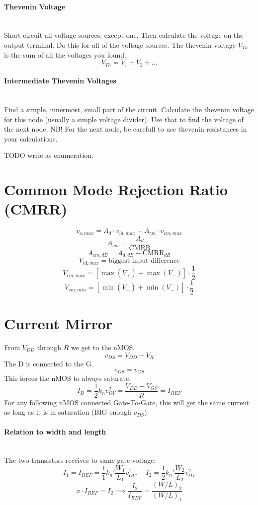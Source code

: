 \documentclass[twocolumn]{article}
\begin{document}
    \paragraph{Thevenin Voltage} \hfill \\
      Short-circuit all voltage sources, except one.
      Then calculate the voltage on the output terminal.
      Do this for all of the voltage sources.
      The thevenin voltage $V_{Th}$ is the sum of all the voltages you found.
      $$V_{Th} = V_1 + V_2 + ...$$
    \paragraph{Intermediate Thevenin Voltages} \hfill \\
      Find a simple, innermost, small part of the circuit.
      Calculate the thevenin voltage for this node (usually a simple voltage
      divider).
      Use that to find the voltage of the next node.
      NB! For the next node, be carefull to use thevenin resistances in
      your calculations.

      TODO write as enumeration.

  \section{Common Mode Rejection Ratio (CMRR)}
    $$v_{o,max} = A_d \cdot v_{id,max} + A_{cm} \cdot v_{cm,max}$$
    $$A_{cm} = \frac{A_d}{\text{CMRR}}$$
    $$A_{cm,dB} = A_{d,dB} - \text{CMRR}_{dB}$$
    $$V_{id,max} = \text{biggest input difference}$$
    $$V_{cm,max} = \left[\max(V_+) + \max(V_-) \right] \cdot \frac{1}{2}$$
    $$V_{cm,min} = \left[\min(V_+) + \min(V_-) \right] \cdot \frac{1}{2}$$

  \section{Current Mirror}
    From $V_{DD}$ through $R$ we get to the nMOS.
    $$v_{DS} = V_{DD} - V_R$$
    The D is connected to the G.
    $$v_{DS} = v_{GS}$$
    This forces the nMOS to always saturate.
    $$I_D = \frac{1}{2} k_n v_{OV}^2 = \frac{V_{DD} - V_{GS}}{R} = I_{REF}$$
    For any following nMOS connected Gate-To-Gate, this will get the same
    current as long as it is in saturation (BIG enough $v_{DS}$).

    \paragraph{Relation to width and length} \hfill \\
    The two transistors receives to same gate voltage.
    $$I_1 = I_{REF} = \frac{1}{1} k_n' \frac{W_1}{L_1} v_{OV}^1
      ,\quad
      I_2 = \frac{1}{2} k_n' \frac{W_2}{L_2} v_{OV}^2
      $$
    $$x \cdot I_{REF} = I_2
      \implies \frac{I_2}{I_{REF}} = \frac{(W/L)_2}{(W/L)_1}
      $$
\end{document}
